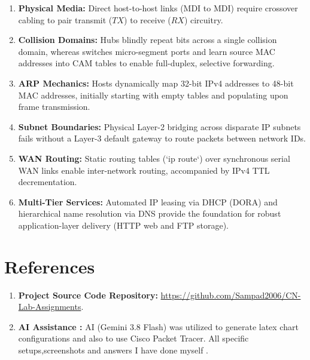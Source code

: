 \documentclass[11pt,a4paper]{article}
\begin{document}
\begin{enumerate}
    \item \textbf{Physical Media:} Direct host-to-host links (MDI to MDI) require crossover cabling to pair transmit ($TX$) to receive ($RX$) circuitry.
    \item \textbf{Collision Domains:} Hubs blindly repeat bits across a single collision domain, whereas switches micro-segment ports and learn source MAC addresses into CAM tables to enable full-duplex, selective forwarding.
    \item \textbf{ARP Mechanics:} Hosts dynamically map 32-bit IPv4 addresses to 48-bit MAC addresses, initially starting with empty tables and populating upon frame transmission.
    \item \textbf{Subnet Boundaries:} Physical Layer-2 bridging across disparate IP subnets fails without a Layer-3 default gateway to route packets between network IDs.
    \item \textbf{WAN Routing:} Static routing tables (`ip route`) over synchronous serial WAN links enable inter-network routing, accompanied by IPv4 TTL decrementation.
    \item \textbf{Multi-Tier Services:} Automated IP leasing via DHCP (DORA) and hierarchical name resolution via DNS provide the foundation for robust application-layer delivery (HTTP web and FTP storage).
\end{enumerate}

\section{References}
\begin{enumerate}[leftmargin=*]
    \item \textbf{Project Source Code Repository:} \url{https://github.com/Sampad2006/CN-Lab-Assignments}.
    \item \textbf{AI Assistance :} AI (Gemini 3.8 Flash) was utilized to generate latex chart configurations and also to use Cisco Packet Tracer. All specific setups,screenshots and answers I have done myself .
\end{enumerate}
\end{document}
